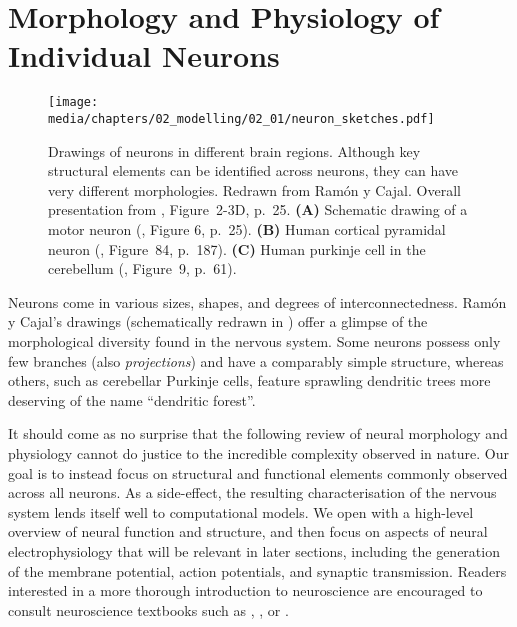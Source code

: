 
\section{Morphology and Physiology of Individual Neurons}
\label{sec:neurophysiology}

\begin{figure}
	\centering
	{\label{fig:neuron_sketches_motor}}%
	{\label{fig:neuron_sketches_pyramidal}}%
	{\label{fig:neuron_sketches_purkinje}}%
	\texttt{[image: media/chapters/02\_modelling/02\_01/neuron\_sketches.pdf]}
	\caption[Drawings of neurons in different brain regions]{Drawings of neurons in different brain regions.
	Although key structural elements can be identified across neurons, they can have very different morphologies.
	Redrawn from Ramón y Cajal.
	Overall presentation from \citet{kandel2012principles}, Figure~2-3D, p.~25.
	\textbf{(A)} Schematic drawing of a motor neuron (\cite{ramonycajal1894nouvelles}, Figure 6, p.~25).
	\textbf{(B)} Human cortical pyramidal neuron (\cite{howell1916textbook}, Figure~84, p.~187).
	\textbf{(C)} Human purkinje cell in the cerebellum (\cite{ramonycajal1909histologie}, Figure~9, p.~61).
	\label{fig:neuron_sketches}
	}
\end{figure}

Neurons come in various sizes, shapes, and degrees of interconnectedness.
Ramón y Cajal's drawings (schematically redrawn in ) offer a glimpse of the morphological diversity found in the nervous system.
Some neurons possess only few branches (also \emph{projections}) and have a comparably simple structure, whereas others, such as cerebellar Purkinje cells, feature sprawling dendritic trees more deserving of the name \enquote{dendritic forest}.

It should come as no surprise that the following review of neural morphology and physiology cannot do justice to the incredible complexity observed in nature.
Our goal is to instead focus on structural and functional elements commonly observed across all neurons.
As a side-effect, the resulting characterisation of the nervous system lends itself well to computational models.
We open with a high-level overview of neural function and structure, and then focus on aspects of neural electrophysiology that will be relevant in later sections, including the generation of the membrane potential, action potentials, and synaptic transmission.
Readers interested in a more thorough introduction to neuroscience are encouraged to consult neuroscience textbooks such as \citet{bear2016neuroscience}, \citet{purves2017neuroscience}, or \citet{kandel2012principles}.


